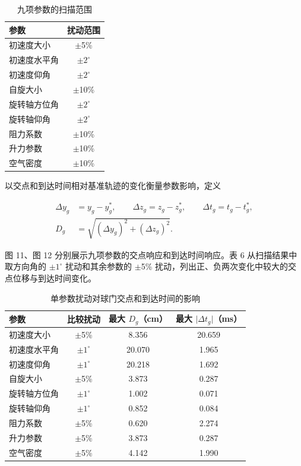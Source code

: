 \documentclass[12pt,letterpaper]{article}
\begin{document}
\begin{table}[H]\centering\small
\renewcommand{\arraystretch}{1.15}
\caption{九项参数的扫描范围}
\begin{tabular}{lc}\toprule
参数 & 扰动范围\\\midrule
初速度大小 & $\pm$5\%\\
初速度水平角 & $\pm$$2^\circ$\\
初速度仰角 & $\pm$$2^\circ$\\
自旋大小 & $\pm$10\%\\
旋转轴方位角 & $\pm$$2^\circ$\\
旋转轴仰角 & $\pm$$2^\circ$\\
阻力系数 & $\pm$10\%\\
升力参数 & $\pm$10\%\\
空气密度 & $\pm$10\%\\
\bottomrule\end{tabular}\end{table}


以交点和到达时间相对基准轨迹的变化衡量参数影响，定义


\begin{equation*}
\begin{aligned}
\Delta y_g&=y_g-y_g^*,\qquad
\Delta z_g=z_g-z_g^*,\qquad
\Delta t_g=t_g-t_g^*,\\
D_g&=\sqrt{(\Delta y_g)^2+(\Delta z_g)^2}.
\end{aligned}
\end{equation*}

图 11、图 12 分别展示九项参数的交点响应和到达时间响应。表 6 从扫描结果中取方向角的 $\pm$$1^\circ$ 扰动和其余参数的 $\pm$5\% 扰动，列出正、负两次变化中较大的交点位移与到达时间变化。


\begin{table}[H]
\centering
\small
\renewcommand{\arraystretch}{1.16}
\caption{单参数扰动对球门交点和到达时间的影响}
\begin{tabular}{lccc}
\toprule
参数 & 比较扰动 & 最大 $D_g$（cm） & 最大 $\lvert\Delta t_g\rvert$（ms）\\
\midrule
初速度大小 & $\pm$5\% & 8.356 & 20.659\\
初速度水平角 & $\pm$$1^\circ$ & 20.070 & 1.965\\
初速度仰角 & $\pm$$1^\circ$ & 20.218 & 1.692\\
自旋大小 & $\pm$5\% & 3.873 & 0.287\\
旋转轴方位角 & $\pm$$1^\circ$ & 1.002 & 0.071\\
旋转轴仰角 & $\pm$$1^\circ$ & 0.852 & 0.084\\
阻力系数 & $\pm$5\% & 0.620 & 2.274\\
升力参数 & $\pm$5\% & 3.873 & 0.287\\
空气密度 & $\pm$5\% & 4.142 & 1.990\\
\bottomrule
\end{tabular}
\end{table}
\end{document}
